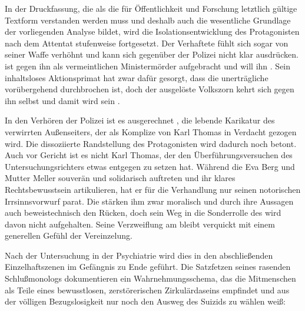 In der Druckfassung, die als die für Öffentlichkeit und Forschung
letztlich gültige Textform verstanden werden muss und deshalb auch die
wesentliche Grundlage der vorliegenden Analyse bildet, wird die
Isolationsentwicklung des Protagonisten nach dem Attentat stufenweise
fortgesetzt. Der Verhaftete fühlt sich sogar von seiner Waffe
verhöhnt 
und kann sich gegenüber der Polizei nicht klar ausdrücken. \Cite{Das Volk} ist
gegen ihn als vermeintlichen Ministermörder aufgebracht und will ihn
\Cite{lynchen} . Sein inhaltsloses Aktionsprimat hat
zwar dafür gesorgt, dass die unerträgliche \Cite{Ruhe} vorübergehend durchbrochen
ist, doch der ausgelöste Volkszorn kehrt sich gegen ihn selbst und damit wird
sein \Cite{Selbstopfer-Idealismus ad absurdum
  geführt}.

In den Verhören der Polizei ist es ausgerechnet \Cite{Traugott Pickel}, die lebende
Karikatur des verwirrten Außenseiters, der als Komplize von Karl Thomas in
Verdacht gezogen wird. Die dissoziierte Randstellung des Protagonisten wird
dadurch noch betont.
Auch vor Gericht ist es nicht Karl Thomas, der den Überführungsversuchen des
Untersuchungsrichters etwas entgegen zu setzen hat. Während die
\Cite{Genossen} Eva Berg und Mutter Meller souverän und solidarisch
auftreten und ihr klares Rechtsbewusstsein artikulieren, hat er für die
Verhandlung nur seinen notorischen Irrsinnsvorwurf
parat.
Die \Cite{Kameraden} stärken ihm zwar moralisch und durch ihre Aussagen auch
beweistechnisch den Rücken, doch sein Weg in die Sonderrolle des
 wird davon nicht aufgehalten. Seine Verzweiflung am
\Cite{Irrsinn der Welt} bleibt verquickt mit einem generellen Gefühl der
Vereinzelung. 

Nach der Untersuchung in der Psychiatrie wird dies in den
abschließenden Einzelhaftszenen im Gefängnis zu Ende geführt.
Die Satzfetzen seines rasenden Schlußmonologs dokumentieren ein
Wahrnehmungsschema, das die Mitmenschen als Teile eines bewusstlosen,
zerstörerischen Zirkulärdaseins empfindet und aus der völligen Bezugslosigkeit 
nur noch den Ausweg des Suizids zu wählen weiß:


